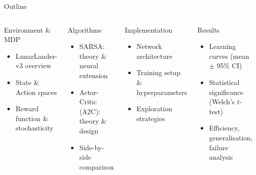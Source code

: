 \documentclass[aspectratio=169, 10pt]{beamer}
\begin{document}
\begin{frame}{Outline}
  \begin{columns}[T]
      \begin{block}{Environment \& MDP}
        \begin{itemize}
          \item LunarLander-v3 overview
          \item State \& Action spaces
          \item Reward function \& stochasticity
        \end{itemize}
      \end{block}
      \vspace{0.5em}
      \begin{block}{Algorithms}
        \begin{itemize}
          \item SARSA: theory \& neural extension
          \item Actor-Critic (A2C): theory \& design
          \item Side-by-side comparison
        \end{itemize}
      \end{block}
      \begin{block}{Implementation}
        \begin{itemize}
          \item Network architecture
          \item Training setup \& hyperparameters
          \item Exploration strategies
        \end{itemize}
      \end{block}
      \vspace{0.5em}
      \begin{block}{Results}
        \begin{itemize}
          \item Learning curves (mean $\pm$ 95\% CI)
          \item Statistical significance (Welch's $t$-test)
          \item Efficiency, generalisation, failure analysis
        \end{itemize}
      \end{block}
  \end{columns}
\end{frame}
\end{document}
